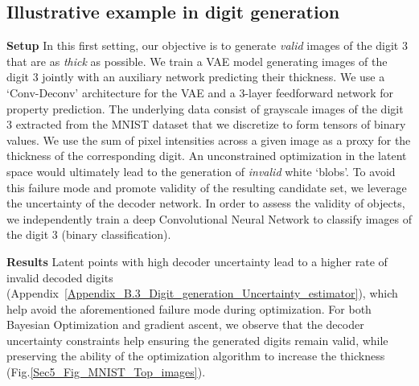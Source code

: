\subsection{Illustrative example in digit generation}
\label{Sec5.1_MNIST}

\textbf{Setup} In this first setting, our objective is to generate \emph{valid} images of the digit 3 that are as \emph{thick} as possible. We train a VAE model generating images of the digit 3 jointly with an auxiliary network predicting their thickness. We use a `Conv-Deconv'\citep{Higgins2017} architecture for the VAE and a 3-layer feedforward network for property prediction. The underlying data consist of grayscale images of the digit 3  extracted from the MNIST dataset \citep{Lecun1998MNIST} that we discretize to form tensors of binary values. We use the sum of pixel intensities across a given image as a proxy for the thickness of the corresponding digit. An unconstrained optimization in the latent space would ultimately lead to the generation of \emph{invalid} white `blobs'. To avoid this failure mode and promote validity of the resulting candidate set, we leverage the uncertainty of the decoder network. In order to assess the validity of objects, we independently train a deep Convolutional Neural Network to classify images of the digit 3  (binary classification).

\textbf{Results} Latent points with high decoder uncertainty lead to a higher rate of invalid decoded digits (Appendix~\ref{Appendix_B.3_Digit_generation_Uncertainty_estimator}), which help avoid the aforementioned failure mode during optimization. 
For both Bayesian Optimization and gradient ascent, we observe that the decoder uncertainty constraints help ensuring the generated digits remain valid, while preserving the ability of the optimization algorithm to increase the thickness (Fig.\ref{Sec5_Fig_MNIST_Top_images}). 


